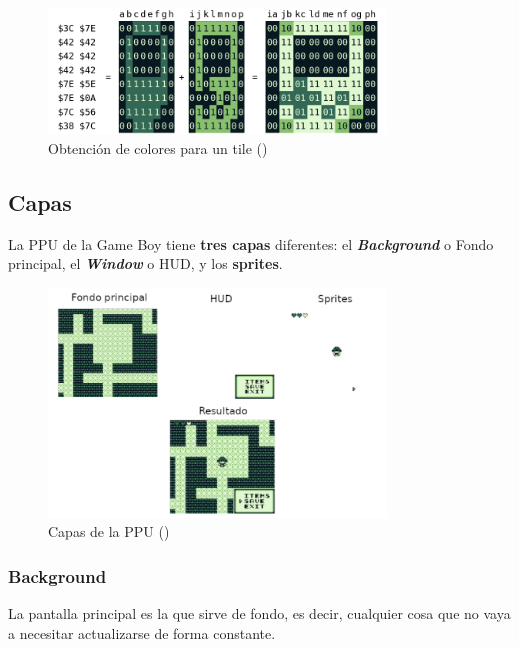 \begin{figure}[H]
    \centering
    \includegraphics[width=0.8\textwidth]{include/images/colores_bits_tile.png}
    \caption{Obtención de colores para un tile (\cite{newpandocs})}
    \label{figure:tile_colors}
\end{figure}

\subsection{Capas}

La PPU de la Game Boy tiene \textbf{tres capas} diferentes: el \textbf{\textit{Background}} o Fondo principal, el \textbf{\textit{Window}} o HUD, y los \textbf{sprites}.

\begin{figure}[H]
    \centering
    \includegraphics[width=0.8\textwidth]{include/images/layers.png}
    \caption{Capas de la PPU (\cite{goldensacra})}
    \label{figure:ppu_layers}
\end{figure}

\subsubsection{Background}

La pantalla principal es la que sirve de fondo, es decir, cualquier cosa que no vaya a necesitar actualizarse de forma constante.

